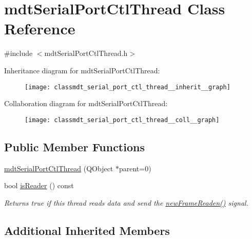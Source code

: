 \hypertarget{classmdt_serial_port_ctl_thread}{\section{mdt\-Serial\-Port\-Ctl\-Thread Class Reference}
\label{classmdt_serial_port_ctl_thread}
}


{\ttfamily \#include $<$mdt\-Serial\-Port\-Ctl\-Thread.\-h$>$}



Inheritance diagram for mdt\-Serial\-Port\-Ctl\-Thread\-:\nopagebreak
\begin{figure}[H]
\begin{center}
\leavevmode
\texttt{[image: classmdt\_serial\_port\_ctl\_thread\_\_inherit\_\_graph]}
\end{center}
\end{figure}


Collaboration diagram for mdt\-Serial\-Port\-Ctl\-Thread\-:\nopagebreak
\begin{figure}[H]
\begin{center}
\leavevmode
\texttt{[image: classmdt\_serial\_port\_ctl\_thread\_\_coll\_\_graph]}
\end{center}
\end{figure}
\subsection*{Public Member Functions}
\begin{DoxyCompactItemize}
\item 
\hyperlink{classmdt_serial_port_ctl_thread_a326a83376c644e8d43224422a6ed4735}{mdt\-Serial\-Port\-Ctl\-Thread} (Q\-Object $\ast$parent=0)
\item 
bool \hyperlink{classmdt_serial_port_ctl_thread_ab87413cedc8d0540eac553e55a3f6407}{is\-Reader} () const 
\begin{DoxyCompactList}\small\item\em Returns true if this thread reads data and send the \hyperlink{classmdt_port_thread_a7fc2245c753fd65e1beffec211c41461}{new\-Frame\-Readen()} signal. \end{DoxyCompactList}\end{DoxyCompactItemize}
\subsection*{Additional Inherited Members}


